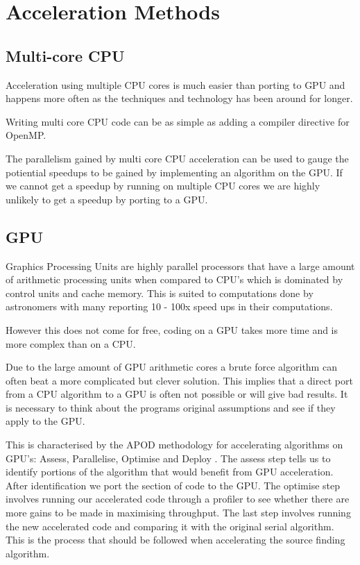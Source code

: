 \documentclass[prodmode,acmtecs]{acmsmall} \usepackage[ruled]{algorithm2e}
\begin{document}
\section{Acceleration Methods}
    \subsection{Multi-core CPU}
    Acceleration using multiple CPU cores is much easier than porting to GPU and happens more often as the techniques
    and technology has been around for longer. {\cite{fluke2011astrophysical}
    Writing multi core CPU code can be as simple as adding a compiler directive for OpenMP\cite{cavuoti2014astrophysical}.

    The parallelism gained by multi core CPU acceleration can be used to gauge the potiential speedups
    to be gained by implementing an algorithm on the GPU. If we cannot get a speedup by running
    on multiple CPU cores we are highly unlikely to get a speedup by porting to a GPU. 
    
        \cite{westerlund2014framework}
        \cite{scott}

    \subsection{GPU}
Graphics Processing Units are highly parallel processors that have a large amount of
arithmetic processing units when compared to CPU's which is dominated by control units
and cache memory. This is suited to computations done by astronomers with many reporting 
10 - 100x speed ups in their computations. \cite{hassan2011unleashing} 

However this does not come for free, coding on a GPU takes more time and is more complex than on a CPU. 

Due to the large amount of GPU arithmetic cores a brute force algorithm can often beat
a more complicated but clever solution.  \cite{fluke2011astrophysical} This implies that a direct port from
a CPU algorithm to a GPU is often not possible or will give bad results. It is necessary to think about the programs original
assumptions and see if they apply to the GPU. 

This is characterised by the APOD methodology for accelerating algorithms on GPU's: Assess, Parallelise, 
Optimise and Deploy \cite{cavuoti2014astrophysical}. The assess step tells us to identify portions of the
algorithm that would benefit from GPU acceleration. After identification we port the section of code
to the GPU. The optimise step involves running our accelerated code through a profiler to see whether 
there are more gains to be made in maximising throughput. The last step involves running the new
accelerated code and comparing it with the original serial algorithm. This is the process
that should be followed when accelerating the source finding algorithm. 

}
\end{document}
